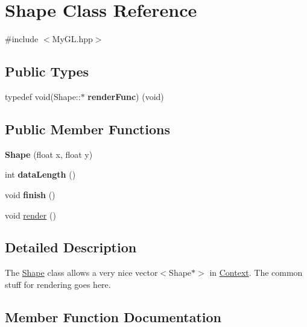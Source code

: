 \hypertarget{classShape}{}\section{Shape Class Reference}
\label{classShape}


{\ttfamily \#include $<$My\+G\+L.\+hpp$>$}

\subsection*{Public Types}
\begin{DoxyCompactItemize}
\item 
typedef void(Shape\+::$\ast$ {\bfseries render\+Func}) (void)\hypertarget{classShape_ab0227d9b119beea793bce34ba3e0b5b8}{}\label{classShape_ab0227d9b119beea793bce34ba3e0b5b8}

\end{DoxyCompactItemize}
\subsection*{Public Member Functions}
\begin{DoxyCompactItemize}
\item 
{\bfseries Shape} (float x, float y)\hypertarget{classShape_a1b3bc50a2d114a27f144a834e7f0af64}{}\label{classShape_a1b3bc50a2d114a27f144a834e7f0af64}

\item 
int {\bfseries data\+Length} ()\hypertarget{classShape_a0098f3d6067b650de0b5e34f44a9257f}{}\label{classShape_a0098f3d6067b650de0b5e34f44a9257f}

\item 
void {\bfseries finish} ()\hypertarget{classShape_a3651abfa2b1d449f35c83b3dc64f64f2}{}\label{classShape_a3651abfa2b1d449f35c83b3dc64f64f2}

\item 
void \hyperlink{classShape_ad62ee6dbad795d967e2f572f6e4e27fb}{render} ()
\end{DoxyCompactItemize}


\subsection{Detailed Description}
The \hyperlink{classShape}{Shape} class allows a very nice vector$<$\+Shape$\ast$$>$ in \hyperlink{classContext}{Context}. The common stuff for rendering goes here. 

\subsection{Member Function Documentation}
